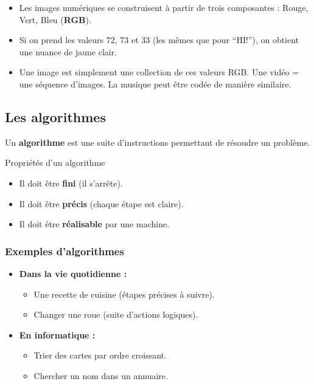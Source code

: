 \begin{itemize}
	\item Les images numériques se construisent à partir de trois composantes : Rouge, Vert, Bleu (\textbf{RGB}).
	\item Si on prend les valeurs 72, 73 et 33 (les mêmes que pour “HI!”), on obtient une nuance de jaune clair.
	\item Une image est simplement une collection de ces valeurs RGB. Une vidéo = une séquence d’images. La musique peut être codée de manière similaire.
\end{itemize}


\subsection{Les algorithmes}

Un \textbf{algorithme} est une suite d’instructions permettant de résoudre un problème.

\begin{UPSTIinfor}{Propriétés d’un algorithme}
	\begin{itemize}
		\item Il doit être \textbf{fini} (il s’arrête).
		\item Il doit être \textbf{précis} (chaque étape est claire).
		\item Il doit être \textbf{réalisable} par une machine.
	\end{itemize}
\end{UPSTIinfor}

\subsubsection{Exemples d’algorithmes}

\begin{itemize}
	\item \textbf{Dans la vie quotidienne :}
	      \begin{itemize}
		      \item Une recette de cuisine (étapes précises à suivre).
		      \item Changer une roue (suite d’actions logiques).
	      \end{itemize}
\end{itemize}

\begin{itemize}
	\item \textbf{En informatique :}
	      \begin{itemize}
		      \item Trier des cartes par ordre croissant.
		      \item Chercher un nom dans un annuaire.
	      \end{itemize}
\end{itemize}

